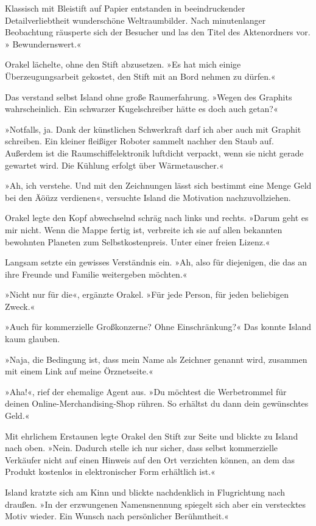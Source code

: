 Klassisch mit Bleistift auf Papier entstanden in beeindruckender Detailverliebtheit wunderschöne Weltraumbilder. Nach minutenlanger Beobachtung räusperte sich der Besucher und las den Titel des Aktenordners vor. » Bewundernswert.«

Orakel lächelte, ohne den Stift abzusetzen. »Es hat mich einige Überzeugungsarbeit gekostet, den Stift mit an Bord nehmen zu dürfen.«

Das verstand selbst Island ohne große Raumerfahrung. »Wegen des Graphits wahrscheinlich. Ein schwarzer Kugelschreiber hätte es doch auch getan?«

»Notfalls, ja. Dank der künstlichen Schwerkraft darf ich aber auch mit Graphit schreiben. Ein kleiner fleißiger Roboter sammelt nachher den Staub auf. Außerdem ist die Raumschiffelektronik luftdicht verpackt, wenn sie nicht gerade gewartet wird. Die Kühlung erfolgt über Wärmetauscher.«

»Ah, ich verstehe. Und mit den Zeichnungen lässt sich bestimmt eine Menge Geld bei den Äöüzz verdienen«, versuchte Island die Motivation nachzuvollziehen.

Orakel legte den Kopf abwechselnd schräg nach links und rechts. »Darum geht es mir nicht. Wenn die Mappe fertig ist, verbreite ich sie auf allen bekannten bewohnten Planeten zum Selbstkostenpreis. Unter einer freien Lizenz.«

Langsam setzte ein gewisses Verständnis ein. »Ah, also für diejenigen, die das an ihre Freunde und Familie weitergeben möchten.«

»Nicht nur für die«, ergänzte Orakel. »Für jede Person, für jeden beliebigen Zweck.«

»Auch für kommerzielle Großkonzerne? Ohne Einschränkung?« Das konnte Island kaum glauben.

»Naja, die Bedingung ist, dass mein Name als Zeichner genannt wird, zusammen mit einem Link auf meine Örznetseite.«

»Aha!«, rief der ehemalige Agent aus. »Du möchtest die Werbetrommel für deinen Online-Merchandising-Shop rühren. So erhältst du dann dein gewünschtes Geld.«

Mit ehrlichem Erstaunen legte Orakel den Stift zur Seite und blickte zu Island nach oben. »Nein. Dadurch stelle ich nur sicher, dass selbst kommerzielle Verkäufer nicht auf einen Hinweis auf den Ort verzichten können, an dem das Produkt kostenlos in elektronischer Form erhältlich ist.«

Island kratzte sich am Kinn und blickte nachdenklich in Flugrichtung nach draußen. »In der erzwungenen Namensnennung spiegelt sich aber ein verstecktes Motiv wieder. Ein Wunsch nach persönlicher Berühmtheit.«

